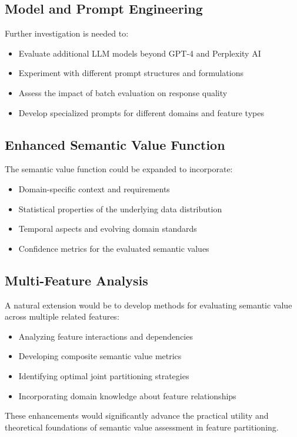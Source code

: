 \documentclass{article}
\begin{document}
\subsection*{Model and Prompt Engineering}
Further investigation is needed to:
\begin{itemize}
    \item Evaluate additional LLM models beyond GPT-4 and Perplexity AI
    \item Experiment with different prompt structures and formulations
    \item Assess the impact of batch evaluation on response quality
    \item Develop specialized prompts for different domains and feature types
\end{itemize}

\subsection*{Enhanced Semantic Value Function}
The semantic value function could be expanded to incorporate:
\begin{itemize}
    \item Domain-specific context and requirements
    \item Statistical properties of the underlying data distribution
    \item Temporal aspects and evolving domain standards
    \item Confidence metrics for the evaluated semantic values
\end{itemize}

\subsection*{Multi-Feature Analysis}
A natural extension would be to develop methods for evaluating semantic value across multiple related features:
\begin{itemize}
    \item Analyzing feature interactions and dependencies
    \item Developing composite semantic value metrics
    \item Identifying optimal joint partitioning strategies
    \item Incorporating domain knowledge about feature relationships
\end{itemize}

These enhancements would significantly advance the practical utility and theoretical foundations of semantic value assessment in feature partitioning.
\end{document}
